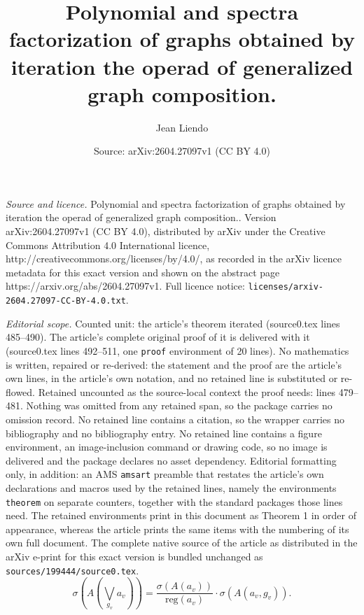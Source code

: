 \documentclass[10pt,a4paper]{amsart}
\title{Polynomial and spectra factorization of graphs obtained by iteration the operad of generalized graph composition.}
\author{Jean Liendo}
\date{Source: arXiv:2604.27097v1 (CC BY 4.0)}
\begin{document}
\maketitle

\noindent\emph{Source and licence.} Polynomial and spectra factorization of graphs obtained by iteration the operad of generalized graph composition.. Version arXiv:2604.27097v1 (CC BY 4.0), distributed by arXiv under the Creative Commons Attribution 4.0 International licence, http://creativecommons.org/licenses/by/4.0/, as recorded in the arXiv licence metadata for this exact version and shown on the abstract page https://arxiv.org/abs/2604.27097v1. Full licence notice: \texttt{licenses/arxiv-2604.27097-CC-BY-4.0.txt}.\par\smallskip

\noindent\textit{Editorial scope.} Counted unit: the article's theorem iterated (source0.tex lines 485--490). The article's complete original proof of it is delivered with it (source0.tex lines 492--511, one \texttt{proof} environment of 20 lines). No mathematics is written, repaired or re-derived: the statement and the proof are the article's own lines, in the article's own notation, and no retained line is substituted or re-flowed.  Retained uncounted as the source-local context the proof needs: lines 479--481.  Nothing was omitted from any retained span, so the package carries no omission record.  No retained line contains a citation, so the wrapper carries no bibliography and no bibliography entry.  No retained line contains a figure environment, an image-inclusion command or drawing code, so no image is delivered and the package declares no asset dependency.  Editorial formatting only, in addition: an AMS \texttt{amsart} preamble that restates the article's own declarations and macros used by the retained lines, namely the environments \texttt{theorem} on separate counters, together with the standard packages those lines need.  The retained environments print in this document as Theorem 1 in order of appearance, whereas the article prints the same items with the numbering of its own full document.  The complete native source of the article as distributed in the arXiv e-print for this exact version is bundled unchanged as \texttt{sources/199444/source0.tex}.
\begin{equation}\label{espectro adyacencia Join arbol}
\sigma\left(A\left(\bigvee_{g_v} a_v\right)\right)=\dfrac{\sigma(A(a_v))}{\mathrm{reg}(a_v)}\cdot \sigma(A(a_v, g_v)).
\end{equation}
\end{document}
